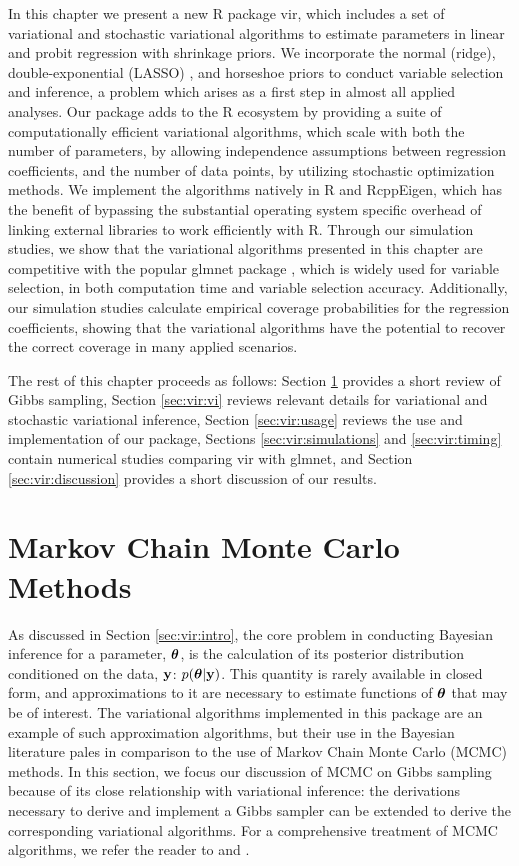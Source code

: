 \documentclass[]{article}
\newcommand{\V}[1]{{\bm{\mathbf{\MakeLowercase{#1}}}}} %
\def\y{{\bf y}}
\def \vtheta{{\V{\theta}}}
\let\proglang=\textsf
\newcommand{\pkg}[1]{{\fontseries{b}\selectfont #1}}
\begin{document}
In this chapter we present a new \proglang{R} package \pkg{vir}, which includes
a set of variational and stochastic variational algorithms to estimate
parameters in linear and probit regression with shrinkage priors.  We
incorporate the normal (ridge), double-exponential (LASSO)
\citep{park2008lasso}, and horseshoe \citep{carvalho2010horseshoe} priors to
conduct variable selection and inference, a problem which arises as a first step
in almost all applied analyses.  Our package adds to the \proglang{R} ecosystem
by providing a suite of computationally efficient variational algorithms, which
scale with both the number of parameters, by allowing independence assumptions
between regression coefficients, and the number of data points, by utilizing
stochastic optimization methods. We implement the algorithms natively in
\proglang{R} and \pkg{RcppEigen}, which has the benefit of bypassing the
substantial operating system specific overhead of linking external libraries to
work efficiently with \proglang{R}.  Through our simulation studies, we show
that the variational algorithms presented in this chapter are competitive with the
popular \pkg{glmnet} package \citep{glmnet}, which is widely used for variable
selection, in both computation time and variable selection accuracy.
Additionally, our simulation studies calculate empirical coverage probabilities
for the regression coefficients, showing that the variational algorithms have
the potential to recover the correct coverage in many applied scenarios. 

The rest of this chapter proceeds as follows: Section \ref{sec:vir:mcmc}
provides a short review of Gibbs sampling, Section \ref{sec:vir:vi} reviews
relevant details for variational and stochastic variational inference, Section
\ref{sec:vir:usage} reviews the use and implementation of our package, Sections
\ref{sec:vir:simulations} and \ref{sec:vir:timing} contain numerical studies
comparing \pkg{vir} with \pkg{glmnet}, and Section \ref{sec:vir:discussion}
provides a short discussion of our results. 

\section{Markov Chain Monte Carlo Methods} \label{sec:vir:mcmc}

As discussed in Section \ref{sec:vir:intro},  the core problem in conducting
Bayesian inference for a parameter, $\vtheta$, is the calculation of its
posterior distribution conditioned on the data, $\y$: $p(\vtheta | \y)$.  This
quantity is rarely available in closed form, and approximations to it are
necessary to estimate functions of $\vtheta$ that may be of interest.  The
variational algorithms implemented in this package are an example of such
approximation algorithms, but their use in the Bayesian literature pales in
comparison to the use of Markov Chain Monte Carlo (MCMC) methods. In this
section, we focus our discussion of MCMC on Gibbs sampling because of its close
relationship with variational inference: the derivations necessary to derive and
implement a Gibbs sampler can be extended to derive the corresponding
variational algorithms. For a comprehensive treatment of MCMC algorithms, we
refer the reader to \citet{robert2013monte} and \citet{brooks2011handbook}.
\end{document}
